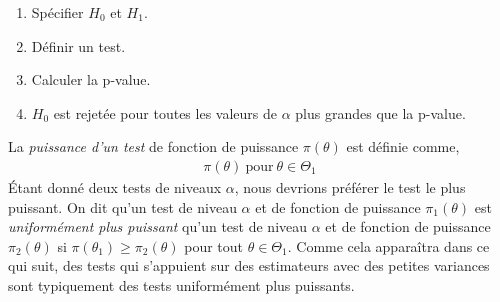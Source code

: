 \begin{enumerate}
\item Spécifier $H_0$ et $H_1$.
\item Définir un test.
\item Calculer la p-value.
\item $H_0$ est rejetée pour toutes les valeurs de $\alpha$ plus grandes que la p-value.
\end{enumerate}
La \emph{puissance d'un test} de fonction de puissance $\pi(\theta)$ est définie comme,
\begin{align*}
\pi(\theta) \ \textrm{pour} \ \theta \in \Theta_1
\end{align*}
\'Etant donné deux tests de niveaux $\alpha$, nous devrions préférer le test le plus puissant. On dit qu'un test de niveau $\alpha$ et de fonction de puissance $\pi_1(\theta)$ est \emph{uniformément plus puissant} qu'un test de niveau $\alpha$ et de fonction de puissance $\pi_2(\theta)$ si $\pi(\theta_1) \geq \pi_2(\theta)$ pour tout $\theta\in \Theta_1$. Comme cela apparaîtra dans ce qui suit, des tests qui s'appuient sur des estimateurs avec des petites variances sont typiquement des tests uniformément plus puissants.


